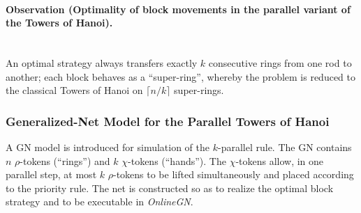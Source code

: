 	\paragraph{Observation (Optimality of block movements in the parallel variant of the Towers of Hanoi).}
	\mbox{}\\
	An optimal strategy always transfers exactly \(k\) consecutive rings from one rod to another; each block behaves as a ``super-ring'', whereby the problem is reduced to the classical Towers of Hanoi on \(\lceil n/k\rceil\) super-rings.
	
	\subsubsection{Generalized-Net Model for the Parallel Towers of Hanoi}
	\hspace*{2.5em}A GN model is introduced for simulation of the \(k\)-parallel rule. The GN contains \(n\) \(\rho\)-tokens (``rings'') and \(k\) \(\chi\)-tokens (``hands''). The \(\chi\)-tokens allow, in one parallel step, at most \(k\) \(\rho\)-tokens to be lifted simultaneously and placed according to the priority rule. The net is constructed so as to realize the optimal block strategy and to be executable in \textit{OnlineGN}.
	
